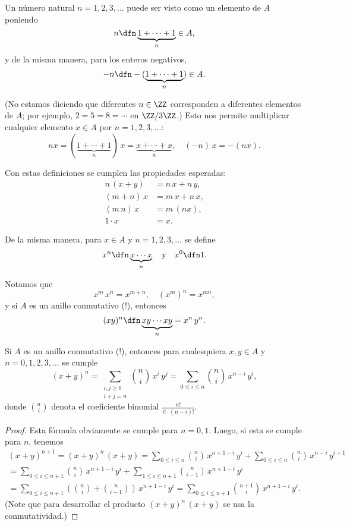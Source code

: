 \begin{definicion}
  Un número natural $n = 1,2,3,\ldots$ puede ser visto como un elemento de $A$
  poniendo
  $$n \dfn \underbrace{1+\cdots+1}_n \in A,$$
  y de la misma manera, para los enteros negativos,
  $$-n \dfn -(\underbrace{1+\cdots+1}_n) \in A.$$
\end{definicion}
\noindent (No estamos diciendo que diferentes $n\in \ZZ$ corresponden a
diferentes elementos de $A$; por ejemplo, $2 = 5 = 8 = \cdots$ en $\ZZ/3\ZZ$.)
Esto nos permite multiplicar cualquier elemento $x\in A$ por $n = 1,2,3,\ldots$:
$$nx = (\underbrace{1 + \cdots + 1}_n)\,x = \underbrace{x + \cdots + x}_n, \quad (-n)\,x = -(nx).$$

Con estas definiciones se cumplen las propiedades esperadas:
\begin{align*}
  n\,(x+y) & = n\,x + n\,y,\\
  (m+n)\,x & = m\,x + n\,x,\\
  (m\,n)\,x & = m\,(nx),\\
  1\cdot x & = x.
\end{align*}

De la misma manera, para $x \in A$ y $n = 1,2,3,\ldots$ se define
$$x^n \dfn \underbrace{x\cdots x}_n \quad\text{y}\quad x^0 \dfn 1.$$

Notamos que
$$x^m\,x^n = x^{m+n}, \quad (x^m)^n = x^{mn},$$
y si $A$ es un anillo conmutativo (!), entonces
$$(xy)^n \dfn \underbrace{xy \cdots xy}_n = x^n\,y^n.$$

\begin{proposicion}
  Si $A$ es un anillo conmutativo (!), entonces para cualesquiera $x,y\in A$ y
  $n = 0,1,2,3,\ldots$ se cumple
  \[ (x+y)^n =
    \sum _{\substack{i,j \ge 0 \\ i + j = n}} {n \choose i} \, x^i\,y^j =
    \sum_{0 \le i \le n} {n\choose i} \, x^{n-i}\,y^i, \]
  donde ${n\choose i}$ denota el coeficiente binomial
  $\frac{n!}{i!\cdot (n-i)!}$.

  \begin{proof}
    Esta fórmula obviamente se cumple para $n = 0,1$. Luego, si esta se cumple
    para $n$, tenemos
    \begin{multline*}
      (x+y)^{n+1} = (x+y)^n\,(x+y) = \sum_{0 \le i \le n} {n \choose i} \, x^{n+1-i}\,y^i + \sum_{0 \le i \le n} {n \choose i} \, x^{n-i}\,y^{i+1} \\
      = \sum_{0 \le i \le n+1} {n \choose i} \, x^{n+1-i}\,y^i + \sum_{1 \le i \le n+1} {n \choose i-1} \, x^{n+1-i}\,y^i \\
      = \sum_{0\le i \le n+1} \left({n \choose i} + {n \choose i-1}\right)\,x^{n+1-i}\,y^i = \sum_{0\le i \le n+1} {n+1 \choose i}\,x^{n+1-i}\,y^i.
    \end{multline*}
    (Note que para desarrollar el producto $(x+y)^n\,(x+y)$ se usa la
    conmutatividad.)
  \end{proof}
\end{proposicion}


